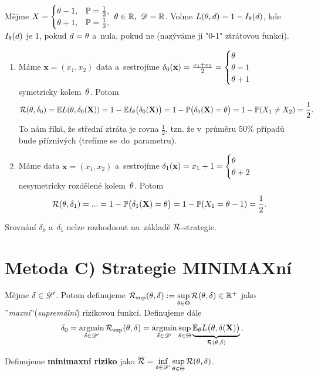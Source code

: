 \begin{example} \label{example:problemy}
	Mějme $X=\begin{cases}
	\theta-1, & \mathbb{P}= \frac{1}{2}, \\ \theta+1, & \mathbb{P}=\frac{1}{2},
	\end{cases}~\theta\in\mathbb{R},~\mathscr{D} =\mathbb{R}$. Volme
	$ L(\theta,d)=1-I_\theta(d)$, kde $I_\theta(d)$ je 1, pokud $d=\theta$ a~nula, pokud ne (nazýváme ji "0-1" ztrátovou funkci).
	
	\begin{enumerate}[1)]
		\item Máme $\textbf{x}=(x_1,x_2)$ data a~sestrojíme $\delta_0(\textbf{x})=\frac{x_1+x_2}{2}=\begin{cases}
		\theta\\\theta-1\\\theta+1
		\end{cases}$ symetricky kolem~$\theta$. Potom
		$$ \mathcal{R}(\theta,\delta_0)=\mathbb{E} L(\theta,\delta_0(\textbf{X}))=1-\mathbb{E} I_\theta\big(\delta_0(\textbf{X})\big)=1-\mathbb{P}\big(\delta_0(\textbf{X})=\theta\big)=1-\mathbb{P}(X_1\neq X_2)=\frac{1}{2}.$$ To nám říká, že střední ztráta je rovna $\frac{1}{2}$, tzn. že v~průměru 50\% případů bude příznivých (trefíme se~do~parametru).
		\item Máme data $\textbf{x}=(x_1,x_2)$ a~sestrojíme $\delta_1(\textbf{x})=x_1+1=\begin{cases}
		\theta\\\theta+2
		\end{cases}$ nesymetricky rozdělené kolem~$\theta$. Potom
		$$\mathcal{R}(\theta,\delta_1)=...=1-\mathbb{P}\big(\delta_1(\textbf{X})=\theta\big)=1-\mathbb{P}(X_1=\theta-1)=\frac{1}{2}.$$
	\end{enumerate}
	Srovnání $\delta_0$ a~$\delta_1$ nelze rozhodnout na~základě $\mathcal{R}$-strategie. 
\end{example}
\section{Metoda C) Strategie MINIMAXní}
\begin{define}
	 Mějme $\delta\in\mathscr{D}'$. Potom definujeme $\mathcal{R}_{\sup}(\theta,\delta):=\sup\limits_{\theta\in\Theta} \mathcal{R}(\theta,\delta) \in\mathbb{R}^+$ jako ''\textit{maxní}''(\textit{supremální}) rizikovou funkci. Definujeme dále
	$$ \delta_0=\mathop{\mathrm{argmin}}\limits_{\delta\in\mathscr{D}'}\mathcal{R}_{\sup}(\theta,\delta)=\mathop{\mathrm{argmin}}\limits_{\delta\in\mathscr{D}' }\sup\limits_{\theta\in\Theta}\underbrace{\mathbb{E}_\theta L\big(\theta,\delta(\textbf{X})\big)}_{\mathcal{R}(\theta,\delta)}.$$
\end{define}

\begin{define}
	Definujeme \textbf{minimaxní riziko} jako $\overline{\mathcal{R}}=\inf\limits_{\delta\in\mathscr{D}'}\sup\limits_{\theta\in\Theta}\mathcal{R}(\theta,\delta)$.
\end{define}

